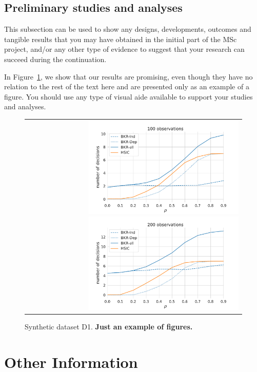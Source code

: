 \documentclass{article}
\begin{document}
\subsection{Preliminary studies and analyses}

This subsection can be used to show any designs, developments, outcomes and tangible results that you may have obtained in the initial part of the MSc project, and/or any other type of evidence to suggest that your research can succeed during the continuation.

In Figure~\ref{fig:2}, we show that our results are promising, even though they have no relation to the rest of the text here and are presented only as an example of a figure. You should use any type of visual aide available to support your studies and analyses.

\begin{figure}[htp]
\centering
 \begin{tabular}{r}
\includegraphics[height=1.9in]{100.pdf}
\includegraphics[height=1.9in]{200.pdf}
\end{tabular}
\caption{Synthetic dataset D1. \textbf{Just an example of figures.}}
\label{fig:2}
\end{figure}


\section{Other Information}
\label{sec:other}
\end{document}
